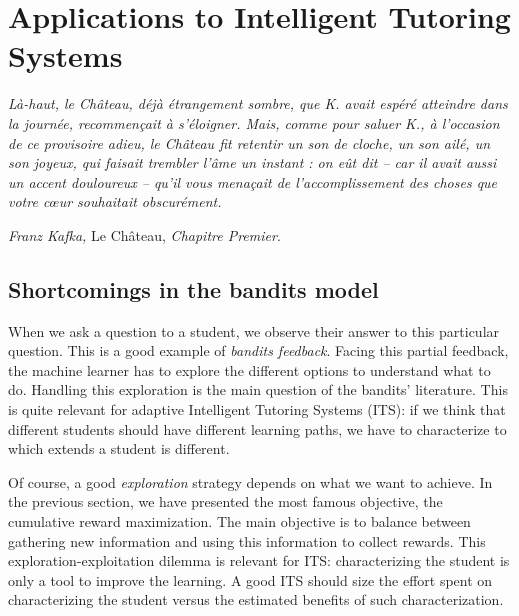 \chapter{Applications to Intelligent Tutoring Systems}
\label{ch:its}
\vspace{-2.5cm}
\emph{Là-haut, le Château, déjà étrangement sombre, que K. avait
espéré atteindre dans la journée, recommençait à s’éloigner.
Mais, comme pour saluer K., à l’occasion de ce provisoire adieu,
le Château fit retentir un son de cloche, un son ailé, un son
joyeux, qui faisait trembler l’âme un instant : on eût dit – car il
avait aussi un accent douloureux – qu’il vous menaçait de
l’accomplissement des choses que votre cœur souhaitait obscurément. }\\ \vspace{-1.2cm}
\begin{flushright}\emph{Franz Kafka,} Le Château, \emph{Chapitre Premier}.
\end{flushright}
\section{Shortcomings in the bandits model}
\label{sec:shortcomings}
When we ask a question to a student, we observe their answer to this particular question. This is a good example of \emph{bandits feedback}. Facing this partial feedback, the machine learner has to explore the different options to understand what to do. Handling this exploration is the main question of the bandits' literature. This is quite relevant for adaptive Intelligent Tutoring Systems (ITS): if we think that different students should have different learning paths, we have to characterize to which extends a student is different. 

Of course, a good \emph{exploration} strategy depends on what we want to achieve. In the previous section, we have presented the most famous objective, \ie the cumulative reward maximization. The main objective is to balance between gathering new information and using this information to collect rewards. This exploration-exploitation dilemma is relevant for ITS: characterizing the student is only a tool to improve the learning. A good ITS should size the effort spent on characterizing the student versus the estimated benefits of such characterization. 

